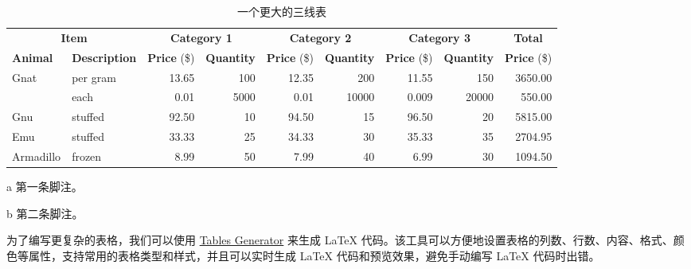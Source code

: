 \begin{table}[!htbp]
  \centering
  \begin{threeparttable}[b]
    \caption{一个更大的三线表}
    \label{tab:bigtable}
    \begin{tabular}{@{}llrrrrrrr@{}} \toprule
      \multicolumn{2}{c}{\textbf{Item}} & \multicolumn{2}{c}{\textbf{Category 1}} & \multicolumn{2}{c}{\textbf{Category 2}} & \multicolumn{2}{c}{\textbf{Category 3}} & \multicolumn{1}{c}{\textbf{Total}} \\ \cmidrule(r){1-2} \cmidrule(lr){3-4} \cmidrule(lr){5-6} \cmidrule(lr){7-8} \cmidrule(l){9-9}
      \textbf{Animal} & \textbf{Description} & \textbf{Price} (\$) & \textbf{Quantity} & \textbf{Price} (\$) & \textbf{Quantity} & \textbf{Price} (\$) & \textbf{Quantity} & \textbf{Price} (\$) \\ \midrule
      Gnat            & per gram\tnote{a}    & 13.65               & 100               & 12.35               & 200               & 11.55               & 150               & 3650.00             \\
                      & each                 & 0.01                & 5000              & 0.01                & 10000             & 0.009               & 20000             & 550.00              \\
      Gnu             & stuffed              & 92.50               & 10                & 94.50               & 15                & 96.50               & 20                & 5815.00             \\
      Emu             & stuffed              & 33.33               & 25                & 34.33               & 30                & 35.33               & 35                & 2704.95             \\
      Armadillo       & frozen               & 8.99                & 50                & 7.99                & 40                & 6.99                & 30\tnote{b}       & 1094.50             \\ \bottomrule
    \end{tabular}
    \begin{tablenotes}
      \item [a] 第一条脚注。
      \item [b] 第二条脚注。
    \end{tablenotes}
  \end{threeparttable}
\end{table}

为了编写更复杂的表格，我们可以使用 \href{https://www.tablesgenerator.com/}{Tables Generator} 来生成 \LaTeX{} 代码。该工具可以方便地设置表格的列数、行数、内容、格式、颜色等属性，支持常用的表格类型和样式，并且可以实时生成 \LaTeX{} 代码和预览效果，避免手动编写 \LaTeX{} 代码时出错。


